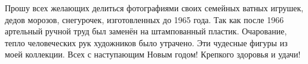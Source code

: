 
Прошу всех желающих делиться фотографиями своих семейных ватных игрушек,
дедов морозов, снегурочек, изготовленных до 1965 года. Так как после 1966
артельный ручной труд был заменён на штампованный пластик. Очарование, тепло
человеческих рук художников было утрачено.  Эти чудесные фигуры из моей
коллекции. Всех с наступающим Новым годом! Крепкого здоровья и удачи!

